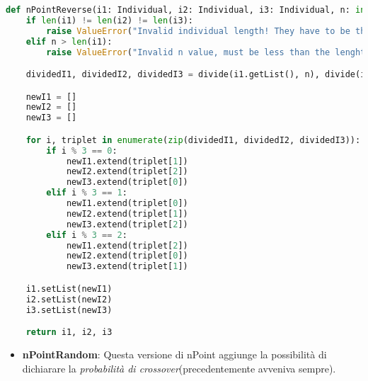 \documentclass{article}
\begin{document}
\begin{lstlisting}[language=Python, breaklines, no caption]
def nPointReverse(i1: Individual, i2: Individual, i3: Individual, n: int) -> tuple[Individual, Individual, Individual]:
    if len(i1) != len(i2) != len(i3):
        raise ValueError("Invalid individual length! They have to be the same.")
    elif n > len(i1):
        raise ValueError("Invalid n value, must be less than the lenght of the individual!")

    dividedI1, dividedI2, dividedI3 = divide(i1.getList(), n), divide(i2.getList(), n), divide(i3.getList(), n)

    newI1 = []
    newI2 = []
    newI3 = []

    for i, triplet in enumerate(zip(dividedI1, dividedI2, dividedI3)):
        if i % 3 == 0:
            newI1.extend(triplet[1])
            newI2.extend(triplet[2])
            newI3.extend(triplet[0])
        elif i % 3 == 1:
            newI1.extend(triplet[0])
            newI2.extend(triplet[1])
            newI3.extend(triplet[2])
        elif i % 3 == 2:
            newI1.extend(triplet[2])
            newI2.extend(triplet[0])
            newI3.extend(triplet[1])

    i1.setList(newI1)
    i2.setList(newI2)
    i3.setList(newI3)

    return i1, i2, i3
        \end{lstlisting}

        \pagebreak

\begin{itemize}
\item\textbf{nPointRandom}: Questa versione di nPoint aggiunge la possibilità di dichiarare la \textit{probabilità di crossover}(precedentemente avveniva sempre).
\end{itemize}
\end{document}
